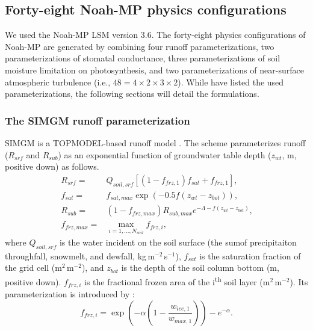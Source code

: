 \documentclass[essd]{copernicus}
\begin{document}
\subsection{Forty-eight Noah-MP physics configurations} \label{sec:data:noahmp}

We used the Noah-MP LSM version 3.6. The forty-eight physics configurations of
Noah-MP are generated by combining four runoff parameterizations, two
parameterizations of stomatal conductance, three parameterizations of soil
moisture limitation on photosynthesis, and two parameterizations of near-surface
atmospheric turbulence (i.e., \(48 = 4 \times 2 \times 3 \times 2\)). While
\citet[Table 1]{zheng2019WRR} have listed the used parameterizations, the
following sections will detail the formulations.

\subsubsection{The SIMGM runoff parameterization}

SIMGM is a TOPMODEL-based runoff model \citep{niu2007JGRA}. The scheme
parameterizes runoff (\(R_{srf}\) and \(R_{sub}\)) as an exponential function of
groundwater table depth (\(z_{wt}\), m, positive down) as follows.
\begin{align}
    R_{srf} =     & Q_{soil,srf} [(1 - f_{frz,1}) f_{sat} + f_{frz,1} ]
    \text{,} \label{eq:SIMGM:rsrf} \\
    f_{sat} =     & f_{sat,max} \exp(-0.5 f (z_{wt} - z_{bot}))
    \text{,} \label{eq:SIMGM:fsat} \\
    R_{sub} =     & (1 - f_{frz,max}) R_{sub,max} e^{-\Lambda - f(z_{wt} - z_{bot})}
    \text{,} \label{eq:SIMGM:rsub} \\
    f_{frz,max} = & \max_{i=1,\dots,N_{soil}} f_{frz,i}
    \text{,} \label{eq:SIMGM:ffrzmax}
\end{align}
where \(Q_{soil,srf}\) is the water incident on the soil surface (the sumof
precipitaiton throughfall, snowmelt, and dewfall, kg\,m$^{-2}$\,s$^{-1}$),
\(f_{sat}\) is the saturation fraction of the grid cell (m$^2$\,m$^{-2}$), and
\(z_{bot}\) is the depth of the soil column bottom (m, positive down).
\(f_{frz,i}\) is the fractional frozen area of the i\textsuperscript{th} soil
layer (m$^2$\,m$^{-2}$). Its parameterization is introduced by
\citet{niu2006JH}:
\begin{equation}
    f_{frz,i} = \exp\left(-\alpha(1 - \frac{w_{ice,1}}{w_{max,1}})\right) -
    e^{-\alpha} \text{.}
\end{equation}
\end{document}
